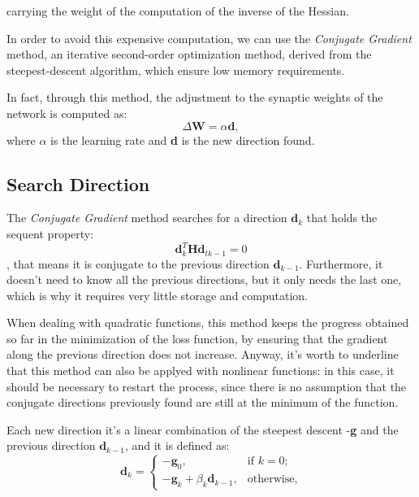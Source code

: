 		carrying the weight of the computation of the inverse of the Hessian.

		In order to avoid this expensive computation, we can use the \textit{Conjugate Gradient} method, an iterative second-order optimization method, derived from the steepest-descent algorithm, which ensure low memory requirements.

		In fact, through this method, the adjustment to the synaptic weights of the network is computed as:
		 \begin{equation} 
		 	\label{weight}
		    \Delta\textbf{W} = \alpha\textbf{d},
		 \end{equation} 
		where $\alpha$ is the learning rate and \textbf{d} is the new direction found.

		\subsection{Search Direction}
		\label{sub:search_direction}
			The \textit{Conjugate Gradient} method searches for a direction $\textbf{d}_k$ that holds the sequent property:
			\begin{equation} 
			\textbf{d}_k^T\textbf{H}\textbf{d}_{tk-1} = 0 
			\end{equation}, that means it is conjugate to the previous direction $\textbf{d}_{k-1}$. Furthermore, it doesn't need to know all the previous directions, but it only needs the last one, which is why it requires very little storage and computation.

			When dealing with quadratic functions, this method keeps the progress obtained so far in the minimization of the loss function, by ensuring that the gradient along the previous direction does not increase.
			Anyway, it's worth to underline that this method can also be applyed with nonlinear functions: in this case, it should be necessary to restart the process, since there is no assumption that the conjugate directions previously found are still at the minimum of the function. 

			Each new direction it's a linear combination of the steepest descent -\textbf{g} and the previous direction $\textbf{d}_{k-1}$, and it is defined as:
			\begin{equation}
			  \textbf{d}_k=\begin{cases}
			    -\textbf{g}_0, & \text{if $k=0$};\\
			    -\textbf{g}_k + \beta_k\textbf{d}_{k-1}, & \text{otherwise,}
			  \end{cases}
			\end{equation}

